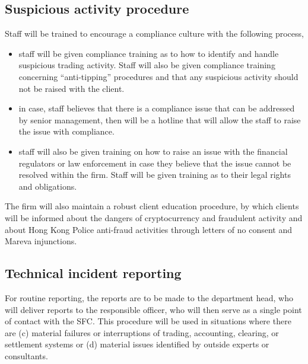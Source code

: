 \subsection{Suspicious activity procedure}

Staff will be trained to encourage a compliance culture with the
following process,
\begin{itemize}
  \item staff will be given compliance training as to how to identify
    and handle suspicious trading activity.  Staff will also be given
    compliance training concerning ``anti-tipping'' procedures and
    that any suspicious activity should not be raised with the client.
  \item in case, staff believes that there is a compliance issue that
    can be addressed by senior management, then will be a hotline that
    will allow the staff to raise the issue with compliance.
  \item staff will also be given training on how to raise an issue
    with the financial regulators or law enforcement in case they
    believe that the issue cannot be resolved within the firm.  Staff
    will be given training as to their legal rights and obligations.
\end{itemize}

The firm will also maintain a robust client education procedure, by
which clients will be informed about the dangers of cryptocurrency and
fraudulent activity and about Hong Kong Police anti-fraud activities
through letters of no consent and Mareva injunctions.

\subsection{Technical incident reporting}
\label{label:techincident}

For routine reporting, the reports are to be made to the department
head, who will deliver reports to the responsible officer, who will
then serve as a single point of contact with the SFC.  This procedure
will be used in situations where there are (c) material failures or
interruptions of trading, accounting, clearing, or settlement systems
or (d) material issues identified by outside experts or consultants.


